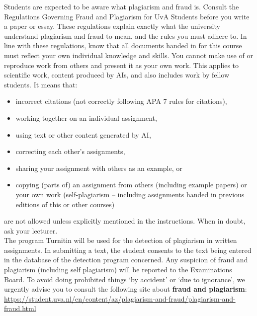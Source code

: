 \documentclass[a4paper,10pt]{report}
\begin{document}
Students are expected to be aware what plagiarism and fraud is. Consult the Regulations Governing Fraud and Plagiarism for UvA Students before you write a paper or essay. These regulations explain exactly what the university understand plagiarism and fraud to mean, and the rules you must adhere to. In line with these regulations, know that all documents handed in for this course must reflect your own individual knowledge and skills. You cannot make use of or reproduce work from others and present it as your own work. This applies to scientific work, content produced by AIs, and also includes work by fellow students.  
It means that:  
	\begin{itemize}
	\item incorrect citations (not correctly following APA 7 rules for citations), 
	\item working together on an individual assignment,
	\item using text or other content generated by AI,
	\item correcting each other’s assignments, 
	\item sharing your assignment with others as an example, or 
	\item copying (parts of) an assignment from others (including example papers) or your own work (self-plagiarism – including assignments handed in previous editions of this or other courses)
\end{itemize}
are not allowed unless explicitly mentioned in the instructions. When in doubt, ask your lecturer. \\

 The program Turnitin will be used for the detection of plagiarism in written assignments. In submitting a text, the student consents to the text being entered in the database of the detection program concerned. Any suspicion of fraud and plagiarism (including self plagiarism) will be reported to the Examinations Board. To avoid doing prohibited things ‘by accident’ or ‘due to ignorance’, we urgently advise you to consult the following site about \textbf{fraud and plagiarism}: \url{https://student.uva.nl/en/content/az/plagiarism-and-fraud/plagiarism-and-fraud.html}
\end{document}
